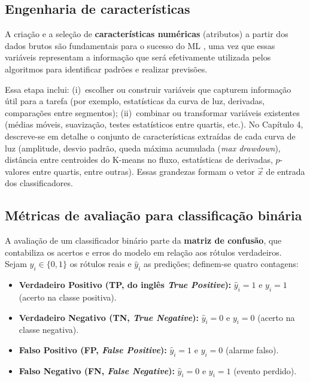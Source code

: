 \subsection{Engenharia de características}

A criação e a seleção de \textbf{características numéricas} (atributos) a partir dos dados brutos são fundamentais para o sucesso do ML \citep{geron2019maos}, uma vez que essas variáveis representam a informação que será efetivamente utilizada pelos algoritmos para identificar padrões e realizar previsões.

Essa etapa inclui: (i)~escolher ou construir variáveis que capturem informação útil para a tarefa (por exemplo, estatísticas da curva de luz, derivadas, comparações entre segmentos); (ii)~combinar ou transformar variáveis existentes (médias móveis, suavização, testes estatísticos entre quartis, etc.). No Capítulo 4, descreve-se em detalhe o conjunto de características extraídas de cada curva de luz (amplitude, desvio padrão, queda máxima acumulada (\textit{max drawdown}), distância entre centroides do K-means no fluxo, estatísticas de derivadas, \(p\)-valores entre quartis, entre outras). Essas grandezas formam o vetor \(\vec{x}\) de entrada dos classificadores.

\subsection{Métricas de avaliação para classificação binária}
\label{sec:metricas_avaliacao}

A avaliação de um classificador binário parte da \textbf{matriz de confusão}, que contabiliza os acertos e erros do modelo em relação aos rótulos verdadeiros. Sejam \(y_i \in \{0,1\}\) os rótulos reais e \(\hat{y}_i\) as predições; definem-se quatro contagens:

\begin{itemize}
	\item \textbf{Verdadeiro Positivo (TP, do inglês \textit{True Positive}):} $\hat{y}_i = 1$ e $y_i = 1$ (acerto na classe positiva).
	\item \textbf{Verdadeiro Negativo (TN, \textit{True Negative}):} $\hat{y}_i = 0$ e $y_i = 0$ (acerto na classe negativa).
	\item \textbf{Falso Positivo (FP, \textit{False Positive}):} $\hat{y}_i = 1$ e $y_i = 0$ (alarme falso).
	\item \textbf{Falso Negativo (FN, \textit{False Negative}):} $\hat{y}_i = 0$ e $y_i = 1$ (evento perdido).
\end{itemize}

